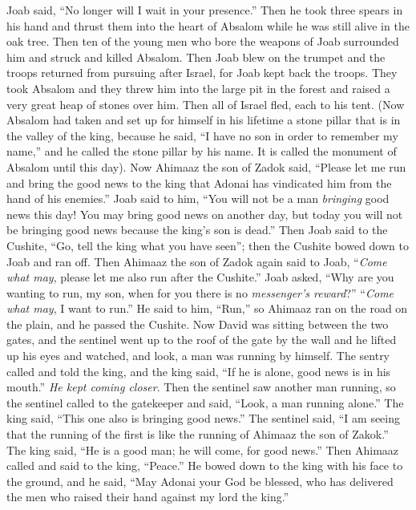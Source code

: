 \begin{biblechapter}
\verse Joab said, “No longer will I wait in your presence.” Then he took three spears in his hand and thrust them into the heart of Absalom while he was still alive in the oak tree.
\verse Then ten of the young men who bore the weapons of Joab surrounded him and struck and killed Absalom.
\verse Then Joab blew on the trumpet and the troops returned from pursuing after Israel, for Joab kept back the troops.
\verse They took Absalom and they threw him into the large pit in the forest and raised a very great heap of stones over him. Then all of Israel fled, each to his tent.
\verse (Now Absalom had taken and set up for himself in his lifetime a stone pillar that is in the valley of the king, because he said, “I have no son in order to remember my name,” and he called the stone pillar by his name. It is called the monument of Absalom until this day).
\verse Now Ahimaaz the son of Zadok said, “Please let me run and bring the good news to the king that Adonai has vindicated him from the hand of his enemies.”
\verse Joab said to him, “You will not be a man \textit{bringing} good news this day! You may bring good news on another day, but today you will not be bringing good news because the king’s son is dead.”
\verse Then Joab said to the Cushite, “Go, tell the king what you have seen”; then the Cushite bowed down to Joab and ran off.
\verse Then Ahimaaz the son of Zadok again said to Joab, “\textit{Come what may}, please let me also run after the Cushite.” Joab asked, “Why are you wanting to run, my son, when for you there is no \textit{messenger’s reward}?”
\verse “\textit{Come what may}, I want to run.” He said to him, “Run,” so Ahimaaz ran on the road on the plain, and he passed the Cushite.
\verse Now David was sitting between the two gates, and the sentinel went up to the roof of the gate by the wall and he lifted up his eyes and watched, and look, a man was running by himself.
\verse The sentry called and told the king, and the king said, “If he is alone, good news is in his mouth.” \textit{He kept coming closer}.
\verse Then the sentinel saw another man running, so the sentinel called to the gatekeeper and said, “Look, a man running alone.” The king said, “This one also is bringing good news.”
\verse The sentinel said, “I am seeing that the running of the first is like the running of Ahimaaz the son of Zakok.” The king said, “He is a good man; he will come, for good news.”
\verse Then Ahimaaz called and said to the king, “Peace.” He bowed down to the king with his face to the ground, and he said, “May Adonai your God be blessed, who has delivered the men who raised their hand against my lord the king.”

\end{biblechapter}
